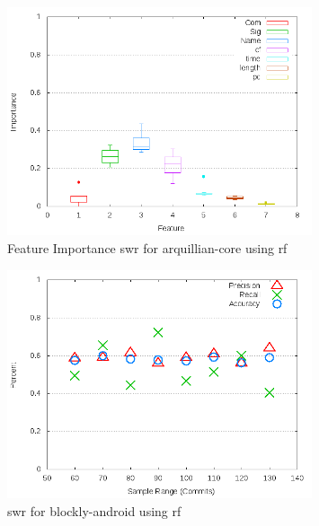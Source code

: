 \begin{figure}[!t]
\centering
\includegraphics[width=0.8\textwidth]{images/rf/test_1/arquillian-core_importance.png}
\caption{Feature Importance \gls{swr} for arquillian-core using \gls{rf}}
\label{fig:test_1_arquillian-core_rf_importance}
\end{figure}

\begin{figure}[!t]
\centering
\includegraphics[width=0.8\textwidth]{images/rf/test_1/blockly-android_sample_range.png}
\caption{\gls{swr} for blockly-android using \gls{rf}}
\label{fig:test_1_blockly-android_rf}
\end{figure}

